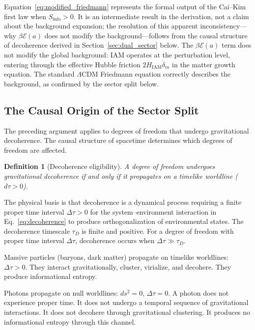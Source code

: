 \documentclass[11pt]{article}
\newtheorem{definition}{Definition}
\begin{document}
Equation~\eqref{eq:modified_friedmann} represents the formal output of the
Cai--Kim first law when $S_\mathrm{info} > 0$.  It is an intermediate
result in the derivation, not a claim about the background expansion; the
resolution of this apparent inconsistency---why $\beta\mathcal{E}(a)$ does
not modify the background---follows from the causal structure of decoherence
derived in Section~\ref{sec:dual_sector} below.  The
$\beta\mathcal{E}(a)$ term does not modify the global background: IAM
operates at the perturbation level, entering through the effective Hubble
friction $2H_\mathrm{IAM}\dot\delta_m$ in the matter growth equation.
The standard $\Lambda$CDM Friedmann equation correctly describes the
background, as confirmed by the sector split below.

\subsection{The Causal Origin of the Sector Split}

The preceding argument applies to degrees of freedom that undergo
gravitational decoherence.  The causal structure of spacetime determines
which degrees of freedom are affected.

\begin{definition}[Decoherence eligibility]
\label{def:eligibility}
A degree of freedom undergoes gravitational decoherence if and only if it
propagates on a timelike worldline ($d\tau > 0$).
\end{definition}

The physical basis is that decoherence is a dynamical process requiring a
finite proper time interval $\Delta\tau > 0$ for the system--environment
interaction in Eq.~\eqref{eq:decoherence} to produce orthogonalization of
environmental states.  The decoherence timescale $\tau_D$ is finite and
positive.  For a degree of freedom with proper time interval $\Delta\tau$,
decoherence occurs when $\Delta\tau \gg \tau_D$.

Massive particles (baryons, dark matter) propagate on timelike worldlines:
$\Delta\tau > 0$.  They interact gravitationally, cluster, virialize, and
decohere.  They produce informational entropy.

Photons propagate on null worldlines: $ds^2 = 0$, $\Delta\tau = 0$.  A
photon does not experience proper time.  It does not undergo a temporal
sequence of gravitational interactions.  It does not decohere through
gravitational clustering.  It produces no informational entropy through
this channel.
\end{document}
